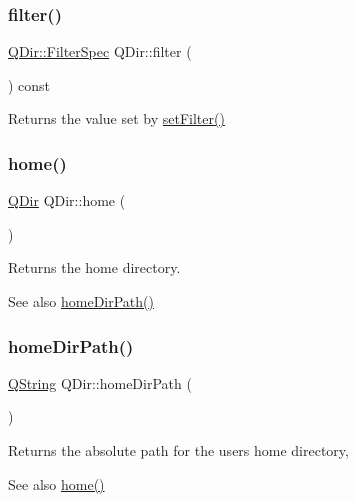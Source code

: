 \subsubsection{\texorpdfstring{filter()}{filter()}}
{\footnotesize\ttfamily \mbox{\hyperlink{class_q_dir_a8b8c5b4f0028081f094c85129b8cc8b1}{Q\+Dir\+::\+Filter\+Spec}} Q\+Dir\+::filter (\begin{DoxyParamCaption}{ }\end{DoxyParamCaption}) const\hspace{0.3cm}{\ttfamily [inline]}}

Returns the value set by \mbox{\hyperlink{class_q_dir_a68d9e723870b5f8226353dc6047a35ee}{set\+Filter()}} \mbox{\label{class_q_dir_ab3881e8a981cc34ede0e6e57a1135c20}} 
\subsubsection{\texorpdfstring{home()}{home()}}
{\footnotesize\ttfamily \mbox{\hyperlink{class_q_dir}{Q\+Dir}} Q\+Dir\+::home (\begin{DoxyParamCaption}{ }\end{DoxyParamCaption})\hspace{0.3cm}{\ttfamily [static]}}

Returns the home directory. \begin{DoxySeeAlso}{See also}
\mbox{\hyperlink{class_q_dir_ac112ea98a56191b8b0d84cd967472b39}{home\+Dir\+Path()}} 
\end{DoxySeeAlso}
\mbox{\label{class_q_dir_ac112ea98a56191b8b0d84cd967472b39}} 
\subsubsection{\texorpdfstring{homeDirPath()}{homeDirPath()}}
{\footnotesize\ttfamily \mbox{\hyperlink{class_q_string}{Q\+String}} Q\+Dir\+::home\+Dir\+Path (\begin{DoxyParamCaption}{ }\end{DoxyParamCaption})\hspace{0.3cm}{\ttfamily [static]}}

Returns the absolute path for the user\textquotesingle{}s home directory, \begin{DoxySeeAlso}{See also}
\mbox{\hyperlink{class_q_dir_ab3881e8a981cc34ede0e6e57a1135c20}{home()}} 
\end{DoxySeeAlso}
\mbox{\label{class_q_dir_a2b420c4c2e7b5764ab1fb35e37d1726f}} 
